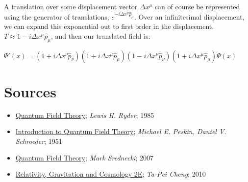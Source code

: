 \documentclass{article}
\begin{document}
        A translation over some displacement vector $\Delta x^\mu$ can of course be represented using the generator of translations, $ e^{-i \Delta x^\mu \hat p_\mu}$. Over an infinitesimal displacement, we can expand this exponential out to first order in the displacement, $ T \approx 1 -i \Delta x^\mu \hat p_\mu $, and then our translated field is:


        $ \Psi'(x) = (1 + i \Delta x^\nu \hat p_\nu)(1 + i \Delta x^\mu \hat p_\mu)(1 - i \Delta x^\nu \hat p_\nu)(1 + i \Delta x^\mu \hat p_\mu) \Psi(x) $



        




        \clearpage
        \section{Sources}
                \begin{itemize}
                        \item \underline{Quantum Field Theory}; \textit{Lewis H. Ryder}; 1985
                        \item \underline{Introduction to Quantum Field Theory}; \textit{Michael E. Peskin, Daniel V. Schroeder}; 1951
                        \item \underline{Quantum Field Theory}; \textit{Mark Srednecki}; 2007
                        \item \underline{Relativity, Gravitation and Cosmology 2E}; \textit{Ta-Pei Cheng}; 2010
                \end{itemize}
\end{document}
